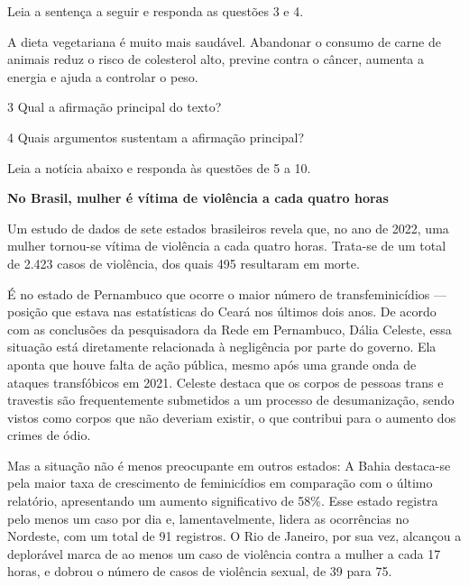Leia a sentença a seguir e responda as questões 3 e 4. 

\begin{myquote}

A dieta vegetariana é muito mais saudável. Abandonar o consumo de carne de animais 
reduz o risco de colesterol alto, previne contra o câncer, aumenta a energia e ajuda a
controlar o peso.

\end{myquote}

\num{3} Qual a afirmação principal do texto?


\num{4} Quais argumentos sustentam a afirmação principal?


Leia a notícia abaixo e responda às questões de 5 a 10.

\begin{myquote}

\textbf{No Brasil, mulher é vítima de violência a cada quatro horas}

Um estudo de dados de sete estados brasileiros revela que, no ano de
2022, uma mulher tornou-se vítima de violência a cada quatro horas. Trata-se de 
um total de 2.423 casos de violência, dos quais 495 resultaram em morte.

É no estado de Pernambuco que ocorre o maior número de transfeminicídios ---
posição que estava nas estatísticas do Ceará nos últimos dois anos. De acordo 
com as conclusões da pesquisadora da Rede em Pernambuco, Dália Celeste, essa 
situação está diretamente relacionada à negligência por parte do governo. Ela 
aponta que houve falta de ação pública, mesmo
após uma grande onda de ataques transfóbicos em 2021. Celeste
destaca que os corpos de pessoas trans e travestis são frequentemente
submetidos a um processo de desumanização, sendo vistos como corpos que não
deveriam existir, o que contribui para o aumento dos crimes de ódio.

Mas a situação não é menos preocupante em outros estados: A Bahia destaca-se 
pela maior taxa de crescimento de feminicídios em comparação com o último relatório, 
apresentando um aumento significativo de 58\%. Esse estado registra pelo 
menos um caso por dia e, lamentavelmente, lidera as ocorrências no Nordeste, 
com um total de 91 registros. O Rio de Janeiro, por sua vez, alcançou a deplorável marca de
ao menos um caso de violência contra a mulher a cada 17 horas, e dobrou 
o número de casos de violência sexual, de 39 para 75.


\end{myquote}


